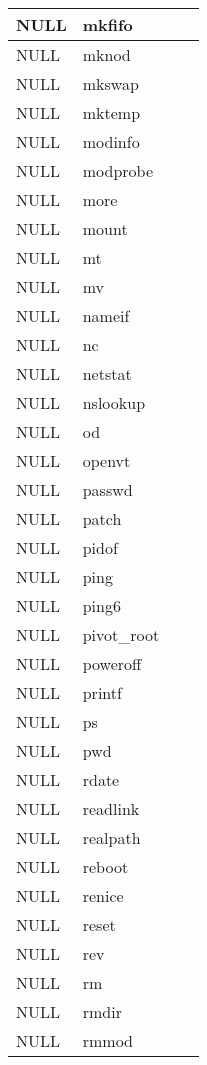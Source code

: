 \begin{longtable}{llp{60mm}p{60mm}}
     \hline
      NULL& mkfifo \\
     \hline
      NULL& mknod \\
     \hline
      NULL& mkswap \\
     \hline
      NULL& mktemp \\
     \hline
      NULL& modinfo \\
     \hline
      NULL& modprobe \\
     \hline
      NULL& more \\
     \hline
      NULL& mount \\
     \hline
      NULL& mt \\
     \hline
      NULL& mv \\
     \hline
      NULL& nameif \\
     \hline
      NULL& nc \\
     \hline
      NULL& netstat \\
     \hline
      NULL& nslookup \\
     \hline
      NULL& od \\
     \hline
      NULL& openvt \\
     \hline
      NULL& passwd \\
     \hline
      NULL& patch \\
     \hline
      NULL& pidof \\
     \hline
      NULL& ping \\
     \hline
      NULL& ping6 \\
     \hline
      NULL& pivot_root \\
     \hline
      NULL& poweroff \\
     \hline
      NULL& printf \\
     \hline
      NULL& ps \\
     \hline
      NULL& pwd \\
     \hline
      NULL& rdate \\
     \hline
      NULL& readlink \\
     \hline
      NULL& realpath \\
     \hline
      NULL& reboot \\
     \hline
      NULL& renice \\
     \hline
      NULL& reset \\
     \hline
      NULL& rev \\
     \hline
      NULL& rm \\
     \hline
      NULL& rmdir \\
     \hline
      NULL& rmmod \\

\end{longtable}
